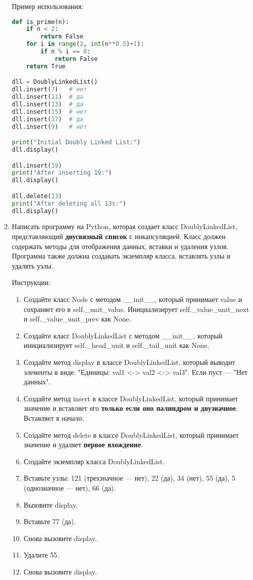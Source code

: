 \begin{enumerate}
Пример использования:
\begin{lstlisting}[language=Python]
def is_prime(n):
    if n < 2:
        return False
    for i in range(2, int(n**0.5)+1):
        if n % i == 0:
            return False
    return True

dll = DoublyLinkedList()
dll.insert(7)   # нет
dll.insert(11)  # да
dll.insert(13)  # да
dll.insert(15)  # нет
dll.insert(17)  # да
dll.insert(9)   # нет

print("Initial Doubly Linked List:")
dll.display()

dll.insert(19)
print("After inserting 19:")
dll.display()

dll.delete(13)
print("After deleting all 13s:")
dll.display()
\end{lstlisting}

\item Написать программу на Python, которая создает класс DoublyLinkedList, представляющий \textbf{двусвязный список} с инкапсуляцией. Класс должен содержать методы для отображения данных, вставки и удаления узлов. Программа также должна создавать экземпляр класса, вставлять узлы и удалять узлы.

Инструкции:
\begin{enumerate}
    \item Создайте класс Node с методом \_\_init\_\_, который принимает value и сохраняет его в self.\_unit\_value. Инициализирует self.\_value\_unit\_next и self.\_value\_unit\_prev как None.
    \item Создайте класс DoublyLinkedList с методом \_\_init\_\_, который инициализирует self.\_head\_unit и self.\_tail\_unit как None.
    \item Создайте метод display в классе DoublyLinkedList, который выводит элементы в виде: "Единицы: val1 <-> val2 <-> val3". Если пуст — "Нет данных".
    \item Создайте метод insert в классе DoublyLinkedList, который принимает значение и вставляет его \textbf{только если оно палиндром и двузначное}. Вставляет в начало.
    \item Создайте метод delete в классе DoublyLinkedList, который принимает значение и удаляет \textbf{первое вхождение}.
    \item Создайте экземпляр класса DoublyLinkedList.
    \item Вставьте узлы: 121 (трехзначное — нет), 22 (да), 34 (нет), 55 (да), 5 (однозначное — нет), 66 (да).
    \item Вызовите display.
    \item Вставьте 77 (да).
    \item Снова вызовите display.
    \item Удалите 55.
    \item Снова вызовите display.
\end{enumerate}


\end{enumerate}
